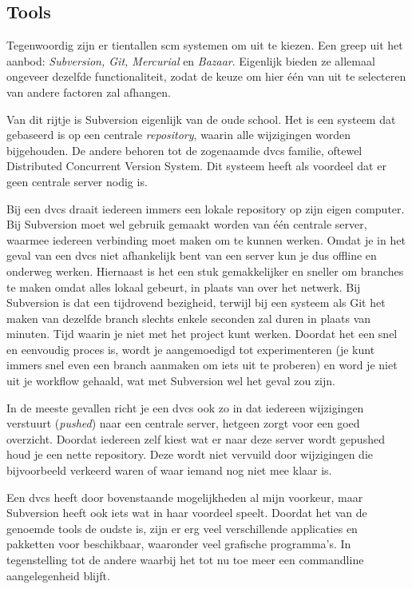 \subsection{Tools}

Tegenwoordig zijn er tientallen {\sc scm} systemen om uit te kiezen. Een greep uit het aanbod: \emph{Subversion, Git, Mercurial} en \emph{Bazaar}. Eigenlijk bieden ze allemaal ongeveer dezelfde functionaliteit, zodat de keuze om hier één van uit te selecteren van andere factoren zal afhangen.

Van dit rijtje is Subversion eigenlijk van de oude school. Het is een systeem dat gebaseerd is op een centrale \emph{repository}, waarin alle wijzigingen worden bijgehouden. De andere behoren tot de zogenaamde {\sc dvcs} familie, oftewel Distributed Concurrent Version System. Dit systeem heeft als voordeel dat er geen centrale server nodig is.

Bij een {\sc dvcs} draait iedereen immers een lokale repository op zijn eigen computer. Bij Subversion moet wel gebruik gemaakt worden van één centrale server, waarmee iedereen verbinding moet maken om te kunnen werken. Omdat je in het geval van een {\sc dvcs} niet afhankelijk bent van een server kun je dus offline en onderweg werken. Hiernaast is het een stuk gemakkelijker en sneller om branches te maken omdat alles lokaal gebeurt, in plaats van over het netwerk. Bij Subversion is dat een tijdrovend bezigheid, terwijl bij een systeem als Git het maken van dezelfde branch slechts enkele seconden zal duren in plaats van minuten. Tijd waarin je niet met het project kunt werken. Doordat het een snel en eenvoudig proces is, wordt je aangemoedigd tot experimenteren (je kunt immers snel even een branch aanmaken om iets uit te proberen) en word je niet uit je workflow gehaald, wat met Subversion wel het geval zou zijn.

In de meeste gevallen richt je een {\sc dvcs} ook zo in dat iedereen wijzigingen verstuurt (\emph{pushed}) naar een centrale server, hetgeen zorgt voor een goed overzicht. Doordat iedereen zelf kiest wat er naar deze server wordt gepushed houd je een nette repository. Deze wordt niet vervuild door wijzigingen die bijvoorbeeld verkeerd waren of waar iemand nog niet mee klaar is.

Een {\sc dvcs} heeft door bovenstaande mogelijkheden al mijn voorkeur, maar Subversion heeft ook iets wat in haar voordeel speelt. Doordat het van de genoemde tools de oudste is, zijn er erg veel verschillende applicaties en pakketten voor beschikbaar, waaronder veel grafische programma's. In tegenstelling tot de andere waarbij het tot nu toe meer een commandline aangelegenheid blijft.

